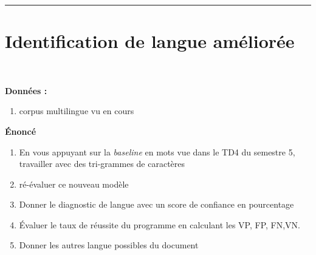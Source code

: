 \newcommand{\numTD}{TD1}
\newcommand{\themeTD}{Analyse en caractères}
\newcommand{\file}{toto.tex}



\hrule

\noindent{}
\newline
\section{Identification de langue améliorée}
~\\
\vspace{-1cm}

\textbf{Données :}
\begin{enumerate}
  \item corpus multilingue vu en cours
\end{enumerate}

\textbf{Énoncé}

\begin{enumerate}
  \item En vous appuyant sur la \textit{baseline} en mots vue dans le TD4 du semestre 5, travailler avec des tri-grammes de caractères
  \item ré-évaluer ce nouveau modèle
  \item Donner le diagnostic de langue avec un score de confiance en pourcentage
  \item Évaluer le taux de réussite du programme en calculant les VP, FP, FN,VN.
  \item Donner les autres langue possibles du document
\end{enumerate}

